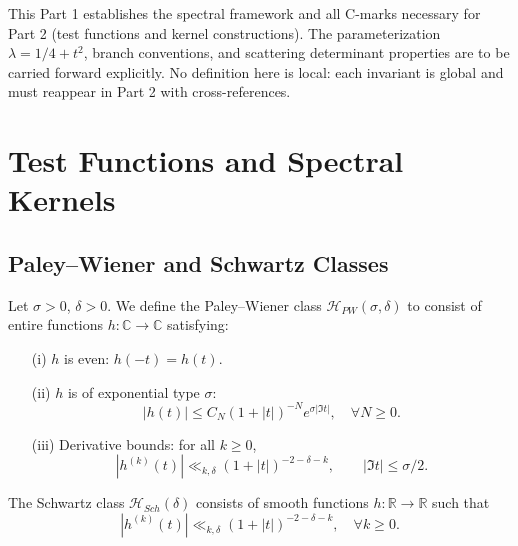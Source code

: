 This Part 1 establishes the spectral framework and all C-marks necessary for Part 2 (test functions and kernel constructions). 
The parameterization $\lambda=1/4+t^2$, branch conventions, and scattering determinant properties are to be carried forward explicitly. 
No definition here is local: each invariant is global and must reappear in Part 2 with cross-references.



\section{Test Functions and Spectral Kernels}
\label{sec:test-functions-kernels}

\subsection{Paley–Wiener and Schwartz Classes}

\begin{definition}
\label{def:PW-class}
Let $\sigma > 0$, $\delta > 0$. 
We define the Paley–Wiener class $\mathcal{H}_{PW}(\sigma,\delta)$ to consist of entire functions $h:\mathbb{C}\to\mathbb{C}$ satisfying:
\begin{enumerate}
  \item[(i)] $h$ is even: $h(-t) = h(t)$.
  \item[(ii)] $h$ is of exponential type $\sigma$: 
  \[
  |h(t)| \leq C_N (1+|t|)^{-N} e^{\sigma|\Im t|}, \quad \forall N\geq 0.
  \]
  \item[(iii)] Derivative bounds: for all $k\geq 0$,
  \[
  |h^{(k)}(t)| \ll_{k,\delta} (1+|t|)^{-2-\delta-k}, \qquad |\Im t| \leq \sigma/2.
  \]
\end{enumerate}
\end{definition}

\begin{definition}
\label{def:Sch-class}
The Schwartz class $\mathcal{H}_{Sch}(\delta)$ consists of smooth functions $h:\mathbb{R}\to\mathbb{R}$ such that
\[
|h^{(k)}(t)| \ll_{k,\delta} (1+|t|)^{-2-\delta-k}, \quad \forall k \geq 0.
\]
\end{definition}

